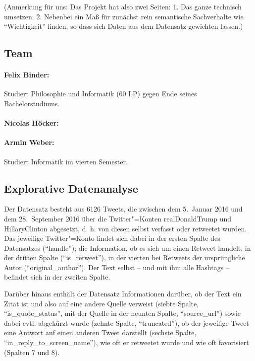 \documentclass[BCOR0mm,fontsize=12pt,paper=a4,final,numbers=noenddot]{scrartcl}
\begin{document}
(Anmerkung für uns: Das Projekt hat also zwei Seiten: 1. Das ganze technisch umsetzen. 2. Nebenbei ein Maß für zunächst rein semantische Sachverhalte wie "`Wichtigkeit"' finden, so dass sich Daten aus dem Datensatz gewichten lassen.)

\subsection{Team}

\paragraph*{Felix Binder:} Studiert Philosophie und Informatik (60 LP) gegen Ende seines Bachelorstudiums.

\paragraph*{Nicolas Höcker:}

\paragraph*{Armin Weber:} Studiert Informatik im vierten Semester.


\subsection{Explorative Datenanalyse}

Der Datensatz besteht aus 6126 Tweets, die zwischen dem 5.~Januar 2016 und dem 28.~September 2016 über die Twitter"=Konten realDonaldTrump und HillaryClinton abgesetzt, d.\,\,h. von diesen selbst verfasst oder retweetet wurden. Das jeweilige Twitter"=Konto findet sich dabei in der ersten Spalte des Datensatzes ("`handle"'); die Information, ob es sich um einen Retweet handelt, in der dritten Spalte ("`is\_retweet"'), in der vierten bei Retweets der ursprüngliche Autor ("`original\_author"'). Der Text selbst -- und mit ihm alle Hashtags -- befindet sich in der zweiten Spalte.

Darüber hinaus enthält der Datensatz Informationen darüber, ob der Text ein Zitat ist und also auf eine andere Quelle verweist (siebte Spalte, "`is\_quote\_status"', mit der Quelle in der neunten Spalte, "`source\_url"') sowie dabei evtl. abgekürzt wurde (zehnte Spalte, "`truncated"'), ob der jeweilige Tweet eine Antwort auf einen anderen Tweet darstellt (sechste Spalte, "`in\_reply\_to\_screen\_name"'), wie oft er retweetet wurde und wie oft favorisiert (Spalten 7 und 8).
\end{document}

